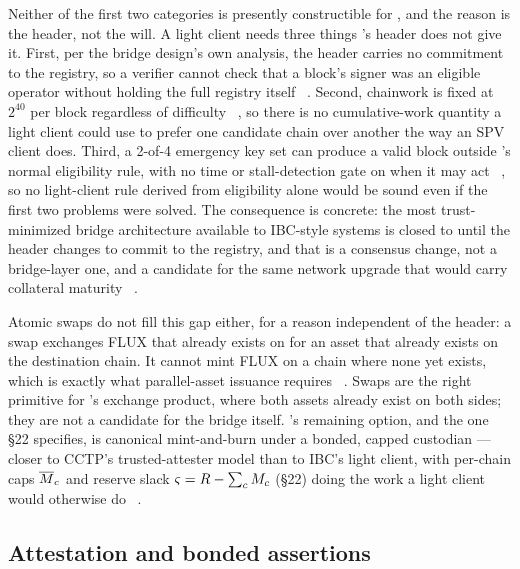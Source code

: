 Neither of the first two categories is presently constructible for \Flux, and the reason is the header,
not the will. A light client needs three things \PoN's header does not give it. First, per the bridge
design's own analysis, the header carries no commitment to the \FluxNode registry, so a verifier cannot
check that a block's signer was an eligible operator without holding the full registry itself \planned\
. Second, chainwork is fixed at $2^{40}$ per block regardless of
difficulty \shipped\ \srccode{fluxd/\allowbreak{}src/\allowbreak{}pow.cpp}{284--290}, so there is no cumulative-work quantity a
light client could use to prefer one candidate chain over another the way an SPV client does. Third, a
2-of-4 emergency key set can produce a valid block outside \PoN's normal eligibility rule, with no time
or stall-detection gate on when it may act \shipped\ , so no
light-client rule derived from \PoN eligibility alone would be sound even if the first two problems were
solved. The consequence is concrete: the most trust-minimized bridge architecture available to
IBC-style systems is closed to \Flux until the header changes to commit to the registry, and that is a
consensus change, not a bridge-layer one, and a candidate for the same network upgrade that would carry
collateral maturity \planned\ \srcintent{§8}.

Atomic swaps do not fill this gap either, for a reason independent of the header: a swap exchanges FLUX
that already exists on \Flux for an asset that already exists on the destination chain. It cannot mint
FLUX on a chain where none yet exists, which is exactly what parallel-asset issuance requires \planned\
. Swaps are the right primitive for \FusionX's exchange product, where
both assets already exist on both sides; they are not a candidate for the bridge itself. \Flux's
remaining option, and the one §22 specifies, is canonical mint-and-burn under a bonded, capped
custodian — closer to CCTP's trusted-attester model than to IBC's light client, with per-chain caps
$\overline{M}_{c}$ and reserve slack $\varsigma = R - \sum_c M_{c}$ (§22) doing the work a light
client would otherwise do \planned\ \srcintent{§22}.

\subsection{Attestation and bonded assertions}

